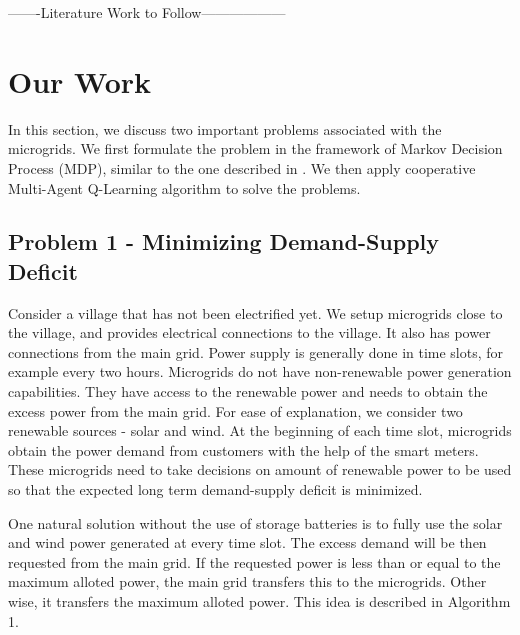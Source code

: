 \documentclass[conference]{IEEEtran}
\begin{document}
-------Literature Work to Follow------------------




\section{Our Work}
In this section, we discuss two important problems associated with the microgrids. We first formulate the problem in the framework of Markov Decision Process (MDP), similar to the one described in \cite{goodmdp}. We then apply cooperative Multi-Agent Q-Learning algorithm to solve the problems.

\subsection{Problem 1 - Minimizing Demand-Supply Deficit}

Consider a village that has not been electrified yet. We setup microgrids close to the village, and provides electrical connections to the village. It also has power connections from the main grid. Power supply is generally done in time slots, for example every two hours. Microgrids do not have non-renewable power generation capabilities. They have access to the renewable power and needs to obtain the excess power from the main grid. For ease of explanation, we consider two renewable sources - solar and wind. At the beginning of each time slot, microgrids obtain the power demand from customers with the help of the smart meters. These microgrids need to take decisions on amount of renewable power to be used so that the expected long term demand-supply deficit is minimized.

One natural solution without the use of storage batteries is to fully use the solar and wind power generated at every time slot. The excess demand will be then requested from the main grid. If the requested power is less than or equal to the maximum alloted power, the main grid transfers this to the microgrids. Other wise, it transfers the maximum alloted power. This idea is described in Algorithm 1.
\end{document}
